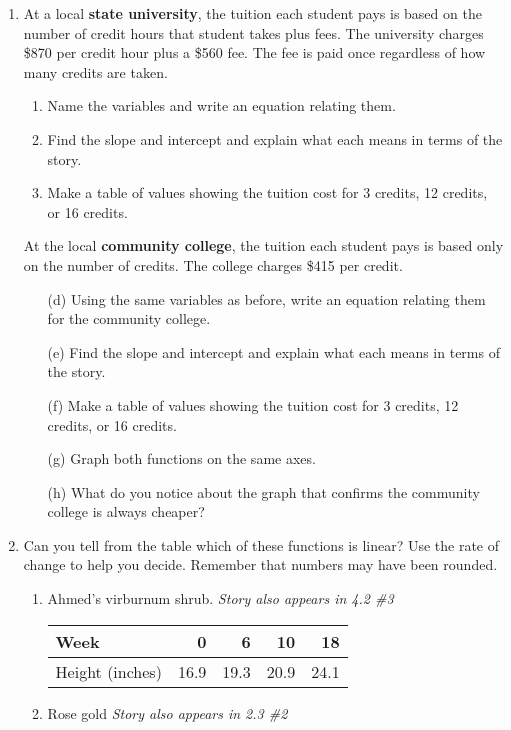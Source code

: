 \begin{enumerate}
\item At a local \textbf{state university}, the tuition each student pays is based on the number of credit hours that student takes plus fees.  The university charges \$870 per credit hour plus a \$560 fee.  The fee is paid once regardless of how many credits are taken.
\begin{enumerate}
\item Name the variables and write an equation relating them.  
\item Find the slope and intercept and explain what each means in terms of the story. 
\item Make a table of values showing the tuition cost for 3 credits, 12 credits, or 16 credits.  
\end{enumerate}
At the local \textbf{community college}, the tuition each student pays is based only on the number of credits.  The college charges \$415 per credit.  
\begin{enumerate}
\item [(d)] Using the same variables as before, write an equation relating them for the community college. 
\item [(e)] Find the slope and intercept and explain what each means in terms of the story. 
\item [(f)] Make a table of values showing the tuition cost for 3 credits, 12 credits, or 16 credits. 
\item [(g)] Graph both functions on the same axes.  
\item [(h)] What do you notice about the graph that confirms the community college is always cheaper?
\end{enumerate} 

\item  Can you tell from the table which of these functions is linear?  Use the rate of change to help you decide.  Remember that numbers may have been rounded.

\begin{enumerate}
\item Ahmed's virburnum shrub. \hfill \emph{Story also appears in 4.2 \#3}

\begin{tabular} {|l|r|r|r|r|} \hline
Week  & 0 & 6 & 10 & 18 \\ \hline
Height (inches) & 16.9 & 19.3 & 20.9 & 24.1  \\ \hline
\end{tabular} \bigskip

\item Rose gold \hfill \emph{Story also appears in 2.3 \#2} 


\end{enumerate}
\end{enumerate}
